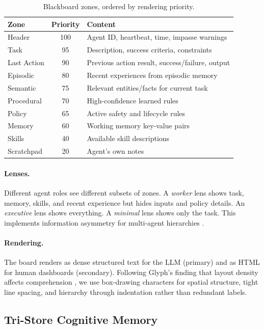 \documentclass[letterpaper]{article}
\begin{document}
\begin{table}[h]
\centering
\small
\begin{tabular}{lcp{4.8cm}}
\toprule
\textbf{Zone} & \textbf{Priority} & \textbf{Content} \\
\midrule
Header & 100 & Agent ID, heartbeat, time, impasse warnings \\
Task & 95 & Description, success criteria, constraints \\
Last Action & 90 & Previous action result, success/failure, output \\
Episodic & 80 & Recent experiences from episodic memory \\
Semantic & 75 & Relevant entities/facts for current task \\
Procedural & 70 & High-confidence learned rules \\
Policy & 65 & Active safety and lifecycle rules \\
Memory & 60 & Working memory key-value pairs \\
Skills & 40 & Available skill descriptions \\
Scratchpad & 20 & Agent's own notes \\
\bottomrule
\end{tabular}
\caption{Blackboard zones, ordered by rendering priority.}
\label{tab:zones}
\end{table}

\paragraph{Lenses.} Different agent roles see different subsets of zones. A \emph{worker} lens shows task, memory, skills, and recent experience but hides inputs and policy details. An \emph{executive} lens shows everything. A \emph{minimal} lens shows only the task. This implements information asymmetry for multi-agent hierarchies \citep{chen2024survey}.

\paragraph{Rendering.} The board renders as dense structured text for the LLM (primary) and as HTML for human dashboards (secondary). Following Glyph's finding that layout density affects comprehension \citep{cheng2025glyph}, we use box-drawing characters for spatial structure, tight line spacing, and hierarchy through indentation rather than redundant labels.

\subsection{Tri-Store Cognitive Memory}
\label{sec:memory}
\end{document}
